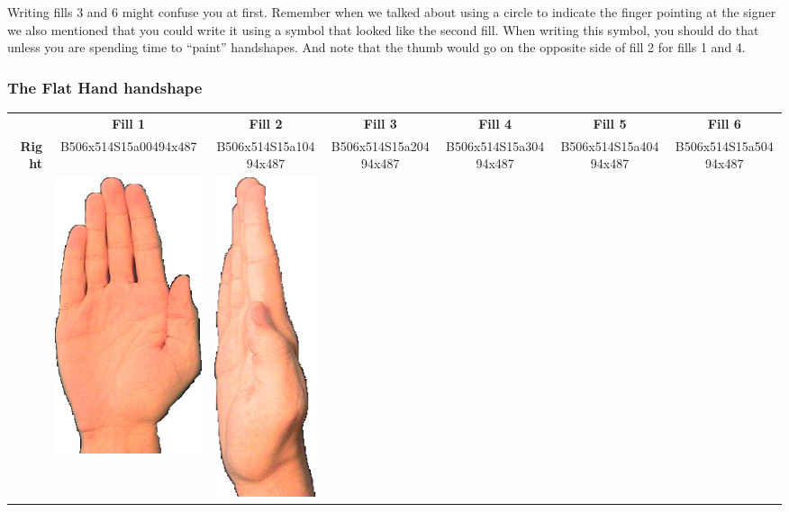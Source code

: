 \documentclass{article}
\begin{document}
Writing fills 3 and 6 might confuse you at first.
Remember when we talked about using a circle to indicate the finger pointing at the signer we also mentioned that you could write it using a symbol that looked like the second fill.
When writing this symbol, you should do that unless you are spending time to ``paint'' handshapes.
And note that the thumb would go on the opposite side of fill 2 for fills 1 and 4.

\subsubsection{The Flat Hand handshape}

\begin{center}
\begin{tabular}{r*{6}{c}}
&\textbf{Fill 1}&\textbf{Fill 2}&\textbf{Fill 3}&\textbf{Fill 4}&\textbf{Fill 5}&\textbf{Fill 6}\\
\multirow{2}{*}{\textbf{Right}}&
B506x514S15a00494x487&
B506x514S15a10494x487&
B506x514S15a20494x487&
B506x514S15a30494x487&
B506x514S15a40494x487&
B506x514S15a50494x487\\
&
\includegraphics[scale=0.1]{images/05-10-1.jpg}&
\includegraphics[scale=0.1]{images/05-10-2.jpg}&

\end{tabular}
\end{center}
\end{document}
